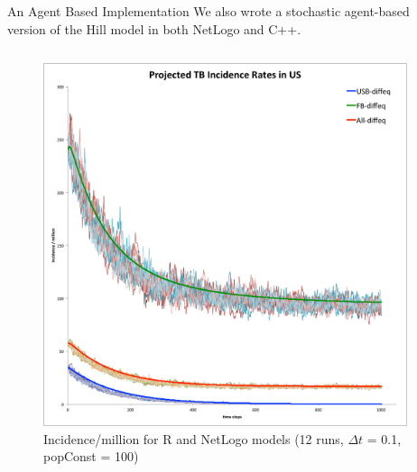 \documentclass[final]{beamer}
\begin{document}
\begin{frame}
\begin{columns}
\begin{column}{.3\textwidth}
    \end{column}
    \begin{column}{.3\textwidth}
      \begin{block}{An Agent Based Implementation}
        We also wrote a stochastic agent-based version of the Hill model in both
        NetLogo and C++.
        \begin{block}{}
          \begin{column}{.45\textwidth}
            \begin{figure}[h]
              \begin{center}
                \includegraphics[width=\textwidth]{NLHMinc}
              \end{center}
              \caption{Incidence/million for R and NetLogo models (12 runs, $\Delta t$ = 0.1, popConst = 100)}
              \label{fig:NLHMinc}
            \end{figure}
          \end{column}
          \begin{column}{.45\textwidth}
            \begin{figure}[h]
              \begin{center}

\end{center}
\end{figure}
\end{column}
\end{block}
\end{block}
\end{column}
\end{columns}
\end{frame}
\end{document}
